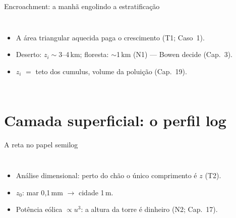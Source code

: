 \documentclass[aspectratio=169,11pt]{beamer}
\begin{document}
\begin{frame}{Encroachment: a manhã engolindo a estratificação}
  \begin{columns}
    \vspace{0.4em}
    \begin{itemize}
      \item A área triangular aquecida paga o crescimento (T1;
            Caso~1).
      \item Deserto: $z_i\sim$3--4\,km; floresta: $\sim$1\,km (N1) —
            Bowen decide (Cap.~3).
      \item $z_i$ $=$ teto dos cumulus, volume da poluição (Cap.~19).
    \end{itemize}
  \end{columns}
\end{frame}

\section{Camada superficial: o perfil log}

\begin{frame}{A reta no papel semilog}
  \begin{columns}
    \vspace{0.4em}
    \begin{itemize}
      \item Análise dimensional: perto do chão o único comprimento é
            $z$ (T2).
      \item $z_0$: mar 0{,}1\,mm $\to$ cidade 1\,m.
      \item Potência eólica $\propto u^3$: a altura da torre é
            dinheiro (N2; Cap.~17).
    \end{itemize}
  \end{columns}
\end{frame}
\end{document}
